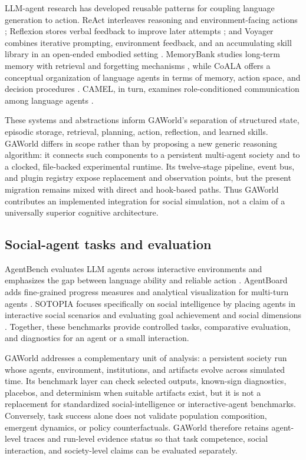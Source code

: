 LLM-agent research has developed reusable patterns for coupling language
generation to action.  ReAct interleaves reasoning and environment-facing
actions \citep{yao2023react}; Reflexion stores verbal feedback to improve later
attempts \citep{shinn2023reflexion}; and Voyager combines iterative prompting,
environment feedback, and an accumulating skill library in an open-ended
embodied setting \citep{wang2023voyager}.  MemoryBank studies long-term memory
with retrieval and forgetting mechanisms \citep{zhong2024memorybank}, while
CoALA offers a conceptual organization of language agents in terms of memory,
action space, and decision procedures \citep{sumers2024coala}.  CAMEL, in
turn, examines role-conditioned communication among language agents
\citep{li2023camel}.

These systems and abstractions inform GAWorld's separation of structured
state, episodic storage, retrieval, planning, action, reflection, and learned
skills.  GAWorld differs in scope rather than by proposing a new generic
reasoning algorithm: it connects such components to a persistent multi-agent
society and to a clocked, file-backed experimental runtime.  Its twelve-stage
pipeline, event bus, and plugin registry expose replacement and observation
points, but the present migration remains mixed with direct and hook-based
paths.  Thus GAWorld contributes an implemented integration for social
simulation, not a claim of a universally superior cognitive architecture.

\subsection{Social-agent tasks and evaluation}

AgentBench evaluates LLM agents across interactive environments and emphasizes
the gap between language ability and reliable action
\citep{liu2024agentbench}.  AgentBoard adds fine-grained progress measures and
analytical visualization for multi-turn agents \citep{ma2024agentboard}.
SOTOPIA focuses specifically on social intelligence by placing agents in
interactive social scenarios and evaluating goal achievement and social
dimensions \citep{zhou2024sotopia}.  Together, these benchmarks provide
controlled tasks, comparative evaluation, and diagnostics for an agent or a
small interaction.

GAWorld addresses a complementary unit of analysis: a persistent society run
whose agents, environment, institutions, and artifacts evolve across simulated
time.  Its benchmark layer can check selected outputs, known-sign diagnostics,
placebos, and determinism when suitable artifacts exist, but it is not a
replacement for standardized social-intelligence or interactive-agent
benchmarks.  Conversely, task success alone does not validate population
composition, emergent dynamics, or policy counterfactuals.  GAWorld therefore
retains agent-level traces and run-level evidence status so that task
competence, social interaction, and society-level claims can be evaluated
separately.

